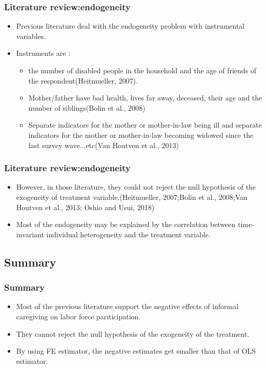 \documentclass{beamer}
\begin{document}
        \begin{frame}\frametitle{Literature review:endogeneity}
            \begin{itemize}
                \item Previous literature deal with the endogeneity problem with instrumental variables.
                \item Instruments are :
                \begin{itemize}
                    \item the number of disabled people in the household and the age of friends of the respondent(Heitmueller, 2007).
                    \item Mother/father have bad health, lives far away, deceased, their age and the number of siblings(Bolin et al., 2008)
                    \item Separate indicators for the mother or mother-in-law being ill and separate indicators for the mother or mother-in-law becoming widowed since the last survey wave...etc(Van Houtven et al., 2013)
                \end{itemize}
            \end{itemize}
        \end{frame}
        \begin{frame}\frametitle{Literature review:endogeneity}
            \begin{itemize}
                \item However, in those literature, they could not reject the null hypothesis of the exogeneity of treatment variable.(Heitmueller, 2007;Bolin et al., 2008;Van Houtven et al., 2013; Oshio and Usui, 2018)
                \item Most of the endogeneity may be explained by the correlation between time-invariant individual heterogeneity and the treatment variable.
            \end{itemize}
        \end{frame}

    \subsection{Summary}
        \begin{frame}\frametitle{Summary}
            \begin{itemize}
                \item Most of the previous literature support the negative effects of informal caregiving on labor force pariticipation.
                \item They cannot reject the null hypothesis of the exogeneity of the treatment.
                \item By using FE estimator, the negative estimates get smaller than that of OLS estimator.
            \end{itemize}
        \end{frame}
\end{document}
